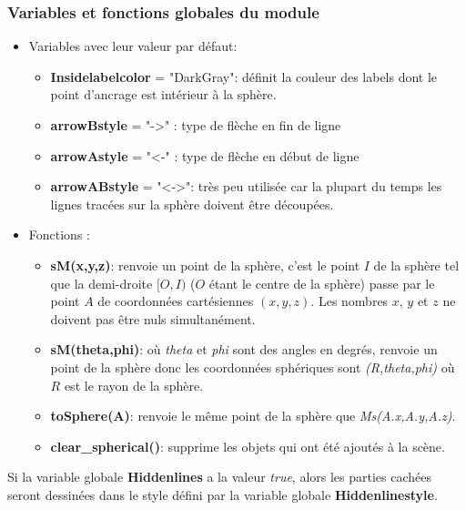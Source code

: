\subsubsection{Variables et fonctions globales du module}

\begin{itemize}
    \item Variables avec leur valeur par défaut:
        \begin{itemize}
            \item \textbf{Insidelabelcolor} = "DarkGray": définit la couleur des labels dont le point d'ancrage est intérieur à la sphère.
            \item \textbf{arrowBstyle} = "->" : type de flèche en fin de ligne
            \item \textbf{arrowAstyle} = "<-" : type de flèche en début de ligne
            \item \textbf{arrowABstyle} = "<->": très peu utilisée car la plupart du temps les lignes tracées sur la sphère doivent être découpées.
        \end{itemize}
    \item Fonctions :
        \begin{itemize}
            \item \textbf{sM(x,y,z)}: renvoie un point de la sphère, c'est le point $I$ de la sphère tel que la demi-droite $[O,I)$ ($O$ étant le centre de la sphère) passe par le point $A$ de coordonnées cartésiennes $(x,y,z)$. Les nombres $x$, $y$ et $z$ ne doivent pas être nuls simultanément.
            \item \textbf{sM(theta,phi)}: où \emph{theta} et \emph{phi} sont des angles en degrés, renvoie un point de la sphère donc les coordonnées sphériques sont \emph{(R,theta,phi)} où $R$ est le rayon de la sphère.
            \item \textbf{toSphere(A)}: renvoie le même point de la sphère que \emph{Ms(A.x,A.y,A.z)}.
            \item \textbf{clear\_spherical()}: supprime les objets qui ont été ajoutés à la scène.
        \end{itemize}
\end{itemize}

Si la variable globale \textbf{Hiddenlines} a la valeur \emph{true}, alors les parties cachées seront dessinées dans le style défini par la variable globale \textbf{Hiddenlinestyle}.

